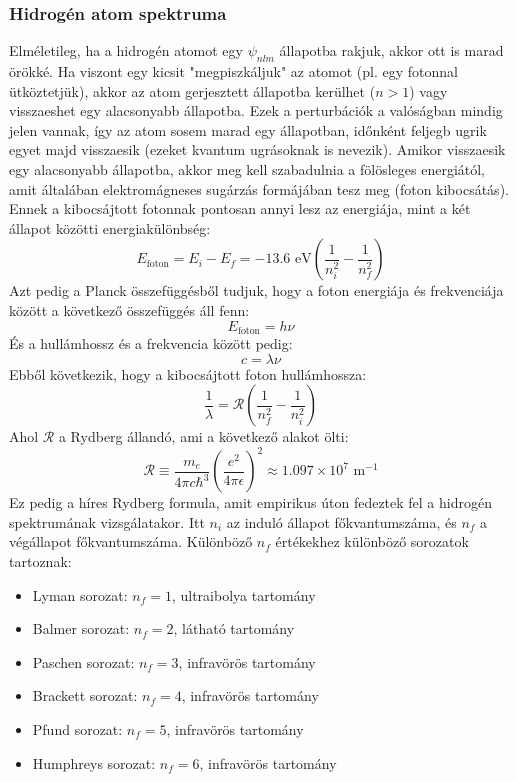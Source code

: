 \documentclass[a4paper,12pt]{article}
\begin{document}
\subsubsection*{Hidrogén atom spektruma}
Elméletileg, ha a hidrogén atomot egy $\psi_{n l m}$ állapotba rakjuk, akkor ott is marad örökké. Ha viszont egy kicsit "megpiszkáljuk" az atomot (pl. egy fotonnal ütköztetjük),
akkor az atom gerjesztett állapotba kerülhet ($n > 1$) vagy visszaeshet egy alacsonyabb állapotba. Ezek a perturbációk a valóságban mindig jelen vannak, így az atom sosem marad egy állapotban,
időnként feljegb ugrik egyet majd visszaesik (ezeket kvantum ugrásoknak is nevezik). Amikor visszaesik egy alacsonyabb állapotba, akkor meg kell szabadulnia a fölösleges energiától,
amit általában elektromágneses sugárzás formájában tesz meg (foton kibocsátás). Ennek a kibocsájtott fotonnak pontosan annyi lesz az energiája, mint a két állapot közötti energiakülönbség:
\begin{equation}
    E_{\text{foton}} = E_i - E_f = -13.6 \text{ eV} \left(\frac{1}{n_i^2} - \frac{1}{n_f^2}\right)
\end{equation}
Azt pedig a Planck összefüggésből tudjuk, hogy a foton energiája és frekvenciája között a következő összefüggés áll fenn:
\begin{equation}
    E_{\text{foton}} = h \nu
\end{equation}
És a hullámhossz és a frekvencia között pedig:
\begin{equation}
    c = \lambda \nu
\end{equation}
Ebből következik, hogy a kibocsájtott foton hullámhossza:
\begin{equation}
    \frac{1}{\lambda} = \mathcal{R} \left(\frac{1}{n_f^2} - \frac{1}{n_i^2}\right)
\end{equation}
Ahol $\mathcal{R}$ a Rydberg állandó, ami a következő alakot ölti:
\begin{equation}
    \mathcal{R} \equiv \frac{m_e}{4 \pi c \hbar^3} \left(\frac{e^2}{4 \pi \epsilon}\right)^2 \approx 1.097 \times 10^7 \text{ m}^{-1}
\end{equation}
Ez pedig a híres Rydberg formula, amit empirikus úton fedeztek fel a hidrogén spektrumának vizsgálatakor. Itt $n_i$ az induló állapot főkvantumszáma,
és $n_f$ a végállapot főkvantumszáma. Különböző $n_f$ értékekhez különböző sorozatok tartoznak:
\begin{itemize}
    \item Lyman sorozat: $n_f = 1$, ultraibolya tartomány
    \item Balmer sorozat: $n_f = 2$, látható tartomány
    \item Paschen sorozat: $n_f = 3$, infravörös tartomány
    \item Brackett sorozat: $n_f = 4$, infravörös tartomány
    \item Pfund sorozat: $n_f = 5$, infravörös tartomány
    \item Humphreys sorozat: $n_f = 6$, infravörös tartomány
\end{itemize}
\end{document}
